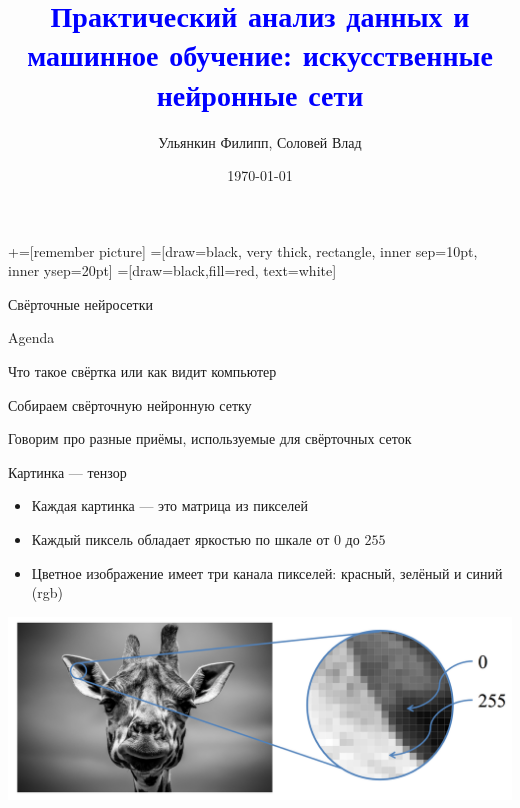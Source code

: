\documentclass[notes,12pt, aspectratio=169]{beamer}
\title[]{\textcolor{blue}{Практический анализ данных и машинное обучение: искусственные нейронные сети}}
\author{Ульянкин Филипп, Соловей Влад}
\date{\today}
\newenvironment{wideitemize}{\itemize\addtolength{\itemsep}{10pt}}{\enditemize}
\begin{document}
\newcommand\marktopleft[1]{%
    \tikz[overlay,remember picture] 
        \node (marker-#1-a) at (-.3em,.3em) {};%
}
\newcommand\markbottomright[2]{%
    \tikz[overlay,remember picture] 
        \node (marker-#1-b) at (0em,0em) {};%
}
+=[remember picture] 
 =[draw=black, very thick, rectangle, inner sep=10pt, inner ysep=20pt]
 =[draw=black,fill=red, text=white]

\begin{frame}
\maketitle
\centering Свёрточные нейросетки
\end{frame}



\begin{frame}{Agenda}
\begin{wideitemize}
\item Что такое свёртка или как видит компьютер 

\item Собираем свёрточную нейронную сетку 

\item Говорим про разные приёмы, используемые для свёрточных сеток
\end{wideitemize} 
\end{frame}


\begin{frame}{Картинка — тензор}
\begin{itemize}
	\item Каждая картинка — это матрица из пикселей
	
	\item Каждый пиксель обладает яркостью по шкале от $0$ до $255$ 
	
	\item Цветное изображение имеет три канала пикселей: красный, зелёный и синий (rgb)
	
\end{itemize}

\begin{center}
	\includegraphics[width=.7\linewidth]{pixels.png}
\end{center}
\end{frame}
\end{document}
